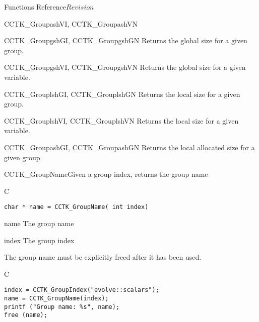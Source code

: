 \begin{cactuspart}{ Functions Reference}{}{$Revision$}
\begin{FunctionDescription}{CCTK\_GroupashVI, CCTK\_GroupashVN}
\begin{SeeAlsoSection}
\begin{SeeAlso}{CCTK\_GroupgshGI, CCTK\_GroupgshGN}
Returns the global size for a given group.
\end{SeeAlso}
\begin{SeeAlso}{CCTK\_GroupgshVI, CCTK\_GroupgshVN}
Returns the global size for a given variable.
\end{SeeAlso}
\begin{SeeAlso}{CCTK\_GrouplshGI, CCTK\_GrouplshGN}
Returns the local size for a given group.
\end{SeeAlso}
\begin{SeeAlso}{CCTK\_GrouplshVI, CCTK\_GrouplshVN}
Returns the local size for a given variable.
\end{SeeAlso}
\begin{SeeAlso}{CCTK\_GroupashGI, CCTK\_GroupashGN}
Returns the local allocated size for a given group.
\end{SeeAlso}
\end{SeeAlsoSection}
\end{FunctionDescription}


\begin{FunctionDescription}{CCTK\_GroupName}{Given a group index, returns the group name}
\label{CCTK-GroupName}
\begin{SynopsisSection}
\begin{Synopsis}{C}
\begin{verbatim}char * name = CCTK_GroupName( int index)\end{verbatim}
\end{Synopsis}
\end{SynopsisSection}
\begin{ParameterSection}
\begin{Parameter}{name}
The group name
\end{Parameter}
\begin{Parameter}{index}
The group index
\end{Parameter}
\end{ParameterSection}
\begin{Discussion}
The group name must be explicitly freed after it has been used.
\end{Discussion}
\begin{ExampleSection}
\begin{Example}{C}
\begin{verbatim}
index = CCTK_GroupIndex("evolve::scalars");
name = CCTK_GroupName(index);
printf ("Group name: %s", name);
free (name);
\end{verbatim}
\end{Example}
\end{ExampleSection}
\end{FunctionDescription}



\end{cactuspart}
